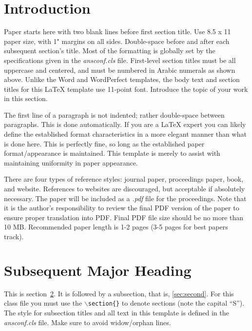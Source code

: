\documentclass{ansconf}
\begin{document}
\begin{multicols}{2}

\section{Introduction}

Paper starts here with two blank lines before first section title.  Use 
8.5 x 11 paper size, with 1" margins on all sides.  Double-space before and
after each subsequent section's title.  Most of the formatting is globally
set by the specifications given in the {\it ansconf.cls} file.  
First-level section titles must be all uppercase and centered, and must 
be numbered in Arabic numerals as shown above.  Unlike the Word and WordPerfect
templates, the body text and section titles for this {\LaTeX} template use 
11-point font.  Introduce the topic of 
your work in this section.

The first line of a paragraph is not indented; rather double-space between 
paragraphs.  This is done automatically. If you are a {\LaTeX} expert you 
can likely define the established format characteristics in a more elegant 
manner than what is done here.  This is perfectly fine, so long as the 
established paper format/appearance is maintained.  This template is merely 
to assist with maintaining uniformity in paper appearance.

There are four types of reference styles: journal paper\cite{journal},
proceedings paper\cite{proc_paper}, book\cite{book}, and website\cite{techrep}.
References to websites are discouraged, but acceptable if absolutely necessary.
The paper will be included as a {\it .pdf} file for the proceedings. Note that
it is the author's responsibility to review the final PDF version of the paper
to ensure proper translation into PDF.  Final PDF file size should be no more
than 10 MB. Recommended paper length is 1-2 pages (3-5 pages for best papers track).

\section{Subsequent Major Heading}
\label{sec:first}

This is section~\ref{sec:first}. It is followed by a subsection, that is, 
\ref{sec:second}. For this class file you must use the 
\texttt{$\backslash$section\{\}} to denote sections (note the capital ``S'').  
The style for subsection titles and all text in this template is defined in 
the {\it ansconf.cls} file.  Make sure to avoid widow/orphan lines.



\end{multicols}
\end{document}
